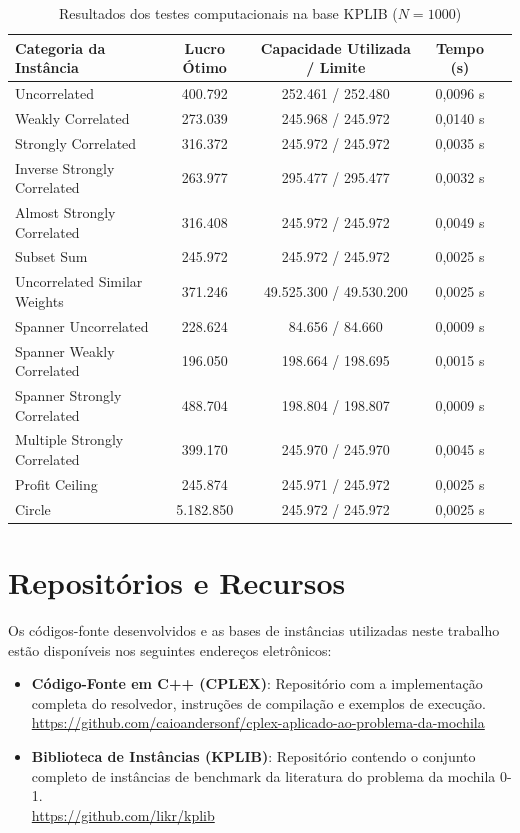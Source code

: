 \documentclass[12pt,a4paper]{article}
\begin{document}
\begin{table}[htbp]
\centering
\caption{Resultados dos testes computacionais na base KPLIB ($N=1000$)}
\label{tab:results}
\begin{tabular}{lcccc}
\toprule
\textbf{Categoria da Instância} & \textbf{Lucro Ótimo} & \textbf{Capacidade Utilizada / Limite} & \textbf{Tempo (s)} \\
\midrule
Uncorrelated & 400.792 & 252.461 / 252.480 & 0,0096 s \\
Weakly Correlated & 273.039 & 245.968 / 245.972 & 0,0140 s \\
Strongly Correlated & 316.372 & 245.972 / 245.972 & 0,0035 s \\
Inverse Strongly Correlated & 263.977 & 295.477 / 295.477 & 0,0032 s \\
Almost Strongly Correlated & 316.408 & 245.972 / 245.972 & 0,0049 s \\
Subset Sum & 245.972 & 245.972 / 245.972 & 0,0025 s \\
Uncorrelated Similar Weights & 371.246 & 49.525.300 / 49.530.200 & 0,0025 s \\
Spanner Uncorrelated & 228.624 & 84.656 / 84.660 & 0,0009 s \\
Spanner Weakly Correlated & 196.050 & 198.664 / 198.695 & 0,0015 s \\
Spanner Strongly Correlated & 488.704 & 198.804 / 198.807 & 0,0009 s \\
Multiple Strongly Correlated & 399.170 & 245.970 / 245.970 & 0,0045 s \\
Profit Ceiling & 245.874 & 245.971 / 245.972 & 0,0025 s \\
Circle & 5.182.850 & 245.972 / 245.972 & 0,0025 s \\
\bottomrule
\end{tabular}
\end{table}

\section{Repositórios e Recursos}
Os códigos-fonte desenvolvidos e as bases de instâncias utilizadas neste trabalho estão disponíveis nos seguintes endereços eletrônicos:
\begin{itemize}
    \item \textbf{Código-Fonte em C++ (CPLEX)}: Repositório com a implementação completa do resolvedor, instruções de compilação e exemplos de execução. \\
    \url{https://github.com/caioandersonf/cplex-aplicado-ao-problema-da-mochila}
    \item \textbf{Biblioteca de Instâncias (KPLIB)}: Repositório contendo o conjunto completo de instâncias de benchmark da literatura do problema da mochila 0-1. \\
    \url{https://github.com/likr/kplib}
\end{itemize}
\end{document}
